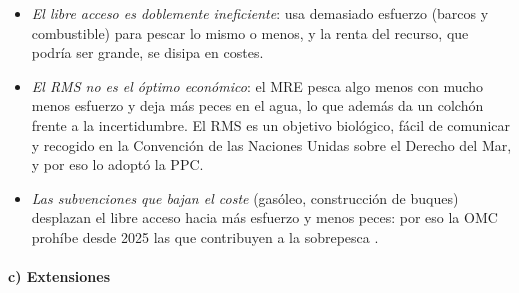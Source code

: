 \documentclass[11pt]{article}
\begin{document}
\begin{itemize}
\item \emph{El libre acceso es doblemente ineficiente}: usa demasiado esfuerzo (barcos y combustible) para pescar lo mismo o menos, y la renta del recurso, que podría ser grande, se disipa en costes.
\item \emph{El RMS no es el óptimo económico}: el MRE pesca algo menos con mucho menos esfuerzo y deja más peces en el agua, lo que además da un colchón frente a la incertidumbre. El RMS es un objetivo biológico, fácil de comunicar y recogido en la Convención de las Naciones Unidas sobre el Derecho del Mar, y por eso lo adoptó la PPC.
\item \emph{Las subvenciones que bajan el coste} (gasóleo, construcción de buques) desplazan el libre acceso hacia más esfuerzo y menos peces: por eso la OMC prohíbe desde 2025 las que contribuyen a la sobrepesca .
\end{itemize}

\paragraph{c) Extensiones}
\end{document}
